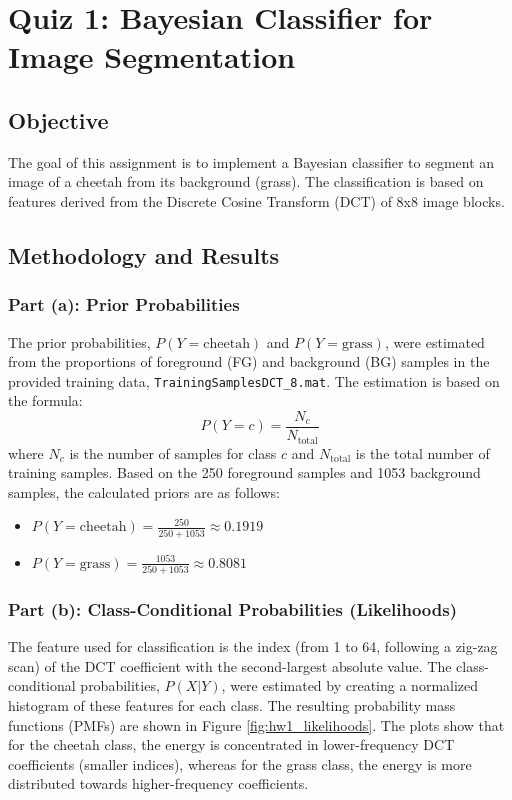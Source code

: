 
\section{Quiz 1: Bayesian Classifier for Image Segmentation}

\subsection{Objective}
The goal of this assignment is to implement a Bayesian classifier to segment an image of a cheetah from its background (grass). The classification is based on features derived from the Discrete Cosine Transform (DCT) of 8x8 image blocks.

\subsection{Methodology and Results}

\subsubsection{Part (a): Prior Probabilities}
The prior probabilities, $P(Y=\text{cheetah})$ and $P(Y=\text{grass})$, were estimated from the proportions of foreground (FG) and background (BG) samples in the provided training data, \texttt{TrainingSamplesDCT\_8.mat}. The estimation is based on the formula:
$$
P(Y=c) = \frac{N_c}{N_{\text{total}}}
$$
where $N_c$ is the number of samples for class $c$ and $N_{\text{total}}$ is the total number of training samples. Based on the 250 foreground samples and 1053 background samples, the calculated priors are as follows:
\begin{itemize}
    \item $P(Y=\text{cheetah}) = \frac{250}{250 + 1053} \approx 0.1919$
    \item $P(Y=\text{grass}) = \frac{1053}{250 + 1053} \approx 0.8081$
\end{itemize}

\subsubsection{Part (b): Class-Conditional Probabilities (Likelihoods)}
The feature used for classification is the index (from 1 to 64, following a zig-zag scan) of the DCT coefficient with the second-largest absolute value. The class-conditional probabilities, $P(X|Y)$, were estimated by creating a normalized histogram of these features for each class. The resulting probability mass functions (PMFs) are shown in Figure \ref{fig:hw1_likelihoods}. The plots show that for the cheetah class, the energy is concentrated in lower-frequency DCT coefficients (smaller indices), whereas for the grass class, the energy is more distributed towards higher-frequency coefficients.

